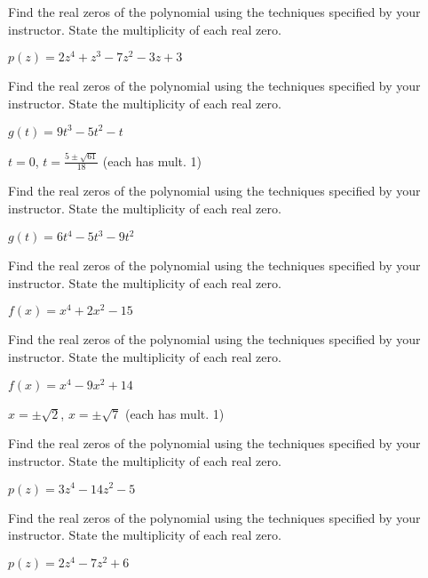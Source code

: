 \documentclass{ximera}
\begin{document}
\begin{problem}
Find the real zeros of the polynomial using the techniques specified by your instructor.  State the multiplicity of each real zero.

$p(z) = 2z^4+z^3-7z^2-3z+3$
\end{problem}

\begin{problem}
Find the real zeros of the polynomial using the techniques specified by your instructor.  State the multiplicity of each real zero.

$g(t) = 9t^{3} - 5t^{2} - t$

\begin{solution}
$t = 0$, $t = \frac{5 \pm \sqrt{61}}{18}$ (each has mult. 1)
\end{solution}
\end{problem}

\begin{problem}
Find the real zeros of the polynomial using the techniques specified by your instructor.  State the multiplicity of each real zero.

$g(t) = 6t^{4} - 5t^{3} - 9t^{2}$
\end{problem}

\begin{problem}
Find the real zeros of the polynomial using the techniques specified by your instructor.  State the multiplicity of each real zero.

$f(x) = x^4+2x^2 - 15$
\end{problem}

\begin{problem}
Find the real zeros of the polynomial using the techniques specified by your instructor.  State the multiplicity of each real zero.

$f(x) = x^4-9x^2+14$

\begin{solution}
$x = \pm \sqrt{2}$, $x = \pm \sqrt{7}$ (each has mult. 1) 
\end{solution}
\end{problem}

\begin{problem}
Find the real zeros of the polynomial using the techniques specified by your instructor.  State the multiplicity of each real zero.

$p(z) = 3z^4-14z^2-5$
\end{problem}

\begin{problem}
Find the real zeros of the polynomial using the techniques specified by your instructor.  State the multiplicity of each real zero.

$p(z) = 2z^4-7z^2+6$
\end{problem}
\end{document}
